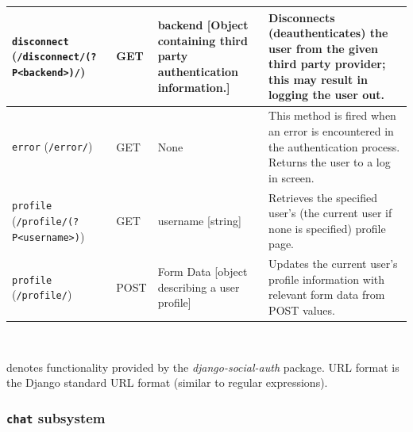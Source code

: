 \begin{table}[htb]
\begin{center}
\begin{tabularx}{ \textwidth}{| p{3cm} | p{1.2cm} | p{4cm} | X | }
	{\tt disconnect} \textasteriskcentered \newline ({\tt /disconnect/\newline(?P<backend>)/}) & GET &  backend [Object containing third party authentication information.] & Disconnects (deauthenticates) the user from the given third party provider; this may result in logging the user out. \\ \hline
	{\tt error} \newline ({\tt /error/}) & GET & None & This method is fired when an error is encountered in the authentication process.  Returns the user to a log in screen. \\ \hline
	{\tt profile} \newline ({\tt /profile/\newline(?P<username>)}) & GET & username [string] & Retrieves the specified user's (the current user if none is specified) profile page. \\ \hline
	{\tt profile} \newline ({\tt /profile/}) & POST & Form Data [object describing a user profile] & Updates the current user's profile information with relevant form data from POST values. \\ \hline
	
	\end{tabularx}
   \\ \rule{0mm}{5mm}
   \textasteriskcentered denotes functionality provided by the {\em django-social-auth} package. \newline
   URL format is the Django standard URL format (similar to regular expressions).
	\end{center}
	 \label{table:authentication}
\end{table}

\subsubsection {{\tt chat} subsystem}

